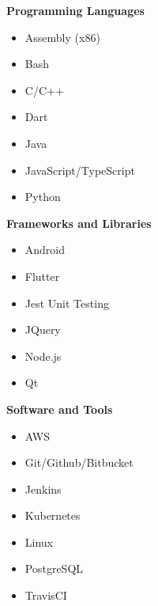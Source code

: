 \documentclass[12pt,letterpaper]{article}
\begin{document}
\begin{skillsection}
    \begin{center}
    \begin{minipage}[t]{.32\linewidth}
        \setlength{\baselineskip}{0pt}
        \textbf{Programming Languages}
        \begin{itemize}
            \item Assembly (x86)
            \item Bash
            \item C/C++
            \item Dart
            \item Java
            \item JavaScript/TypeScript
            \item Python
        \end{itemize}
    \end{minipage}
    \begin{minipage}[t]{.32\linewidth}
        \setlength{\baselineskip}{0pt}
        \textbf{Frameworks and Libraries}
        \begin{itemize}
            \item Android
            \item Flutter
            \item Jest Unit Testing
            \item JQuery
            \item Node.js
            \item Qt
        \end{itemize}
    \end{minipage}
    \begin{minipage}[t]{.32\linewidth}
        \setlength{\baselineskip}{0pt}
        \textbf{Software and Tools}
        \begin{itemize}
            \item AWS
            \item Git/Github/Bitbucket
            \item Jenkins
            \item Kubernetes
            \item Linux
            \item PostgreSQL
            \item TravisCI
        \end{itemize}
    \end{minipage}
    \end{center}
\end{skillsection}
\setlength{\baselineskip}{18pt}
\end{document}
